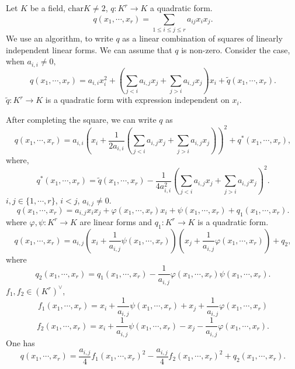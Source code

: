 \begin{remark}
    Let $K$ be a field, $\mathrm{char} K \neq 2$, $q: K^r \rightarrow K$ a quadratic form.
    $$ q(x_1,\cdots,x_r) = \sum_{1\le i \le j\le r} a_{ij} x_i x_j. $$
    We use an algorithm, to write $q$ as a linear combination of squares of linearly independent linear forms. We can assume that $q$ is non-zero.
    Consider the case, when $a_{i,i}\neq 0,$
    $$ q(x_1,\cdots,x_r) = a_{i,i} x_i^2 +\left(\sum_{j<i} a_{i,j} x_j + \sum_{j>i} a_{i,j} x_j\right)x_i + \tilde{q}\left(x_1,\cdots,x_r\right).$$
    $\tilde{q}:K^{r}\rightarrow K$ is a quadratic form with expression independent on $x_i$. 

    \quad After completing the square, we can write $q$ as
    $$ q(x_1,\cdots,x_r) = a_{i,i} \left(x_i + \frac{1}{2 a_{i,i}} \left(\sum_{j<i} a_{i,j} x_j + \sum_{j>i} a_{i,j} x_j\right)\right)^2 + q^*\left(x_1,\cdots,x_r\right),$$
    where,
    $$ q^* \left(x_1,\cdots,x_r\right)=\tilde{q}\left(x_1,\cdots,x_r\right) - \frac{1}{4 a_{i,i}^2} \left(\sum_{j<i} a_{i,j} x_j + \sum_{j>i} a_{i,j} x_j\right)^2.$$
    $i,j\in\{1,\cdots,r\}$, $i<j$, $a_{i,j}\neq 0$.
    $$ q(x_1,\cdots,x_r) = a_{i,j} x_i x_j + \varphi(x_1,\cdots,x_r)x_i + \psi(x_1,\cdots,x_r) + q_1(x_1,\cdots,x_r).$$
    where $\varphi, \psi : K^r \rightarrow K$ are linear forms and $q_1: K^r\rightarrow K$ is a quadratic form.
    $$ q(x_1,\cdots,x_r) = a_{i,j} \left(x_i + \frac{1}{a_{i,j}} \psi(x_1,\cdots,x_r)\right) \left(x_j + \frac{1}{a_{i,j}} \varphi(x_1,\cdots,x_r)\right) + q_2,$$
    where
    $$ q_2(x_1,\cdots,x_r) = q_1(x_1,\cdots,x_r) - \frac{1}{a_{i,j}} \varphi(x_1,\cdots,x_r) \psi(x_1,\cdots,x_r).$$
    $f_1,f_2\in \left(K^r\right)^\vee$,
    $$ f_1(x_1,\cdots,x_r) = x_i + \frac{1}{a_{i,j}} \psi(x_1,\cdots,x_r) + x_j + \frac{1}{a_{i,j}}\varphi(x_1,\cdots,x_r)$$
    $$ f_2(x_1,\cdots,x_r) = x_i + \frac{1}{a_{i,j}} \psi(x_1,\cdots,x_r) - x_j - \frac{1}{a_{i,j}}\varphi(x_1,\cdots,x_r).$$
    One has
    $$ q(x_1,\cdots,x_r) = \frac{a_{i,j}}{4} f_1(x_1,\cdots,x_r)^2 - \frac{a_{i,j}}{4} f_2(x_1,\cdots,x_r)^2 + q_2(x_1,\cdots,x_r).$$
\end{remark}

